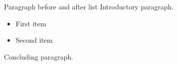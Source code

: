 \documentclass[14pt,t]{beamer-accessibility}
\begin{document}
\begin{frame}{Paragraph before and after list}
Introductory paragraph.

\begin{itemize}
\item First item
\item Second item
\end{itemize}

Concluding paragraph.
\end{frame}
\end{document}
